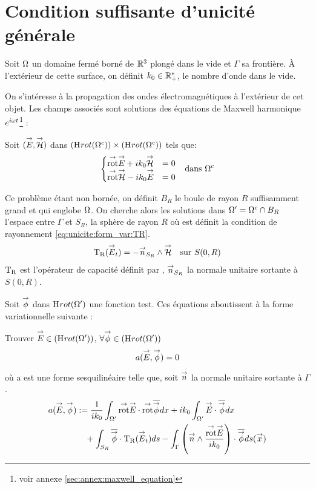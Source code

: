 \section{Condition suffisante d'unicité générale}

  Soit \(\Omega\) un domaine fermé borné de \(\mathbb R^3\) plongé dans le vide et \(\Gamma\) sa frontière.
  À l'extérieur de cette surface, on définit \(k_0 \in \mathbb R_+^*\), le nombre d'onde dans le vide.

  On s’intéresse à la propagation des ondes électromagnétiques à l'extérieur de cet objet. Les champs associés sont solutions des équations de Maxwell harmonique \(e^{i\omega t}\)\footnote{voir annexe \ref{sec:annex:maxwell_equation}} :

  Soit \(({\overset{\rightarrow}{E}},{\overset{\rightarrow}{\mathcal{H}}})\) dans \((\mathrm{H}_\mathrm{{}}{rot}(\Omega^c)) \times (\mathrm{H}_\mathrm{{}}{rot}(\Omega^c))\) tels que:
  \begin{align}
  \left\lbrace
    \begin{matrix}
      {{\overset{\rightarrow}{\operatorname{rot}}}} {\overset{\rightarrow}{E}} + i k_0 {\overset{\rightarrow}{\mathcal{H}}} &= 0
      \\
      {{\overset{\rightarrow}{\operatorname{rot}}}} {\overset{\rightarrow}{\mathcal{H}}} - i k_0 {\overset{\rightarrow}{E}} &= 0
    \end{matrix}
    \right. && \text{dans \(\Omega^c\)}
  \end{align}

  Ce problème étant non bornée, on définit \(B_R\) le boule de rayon \(R\) suffisamment grand et qui englobe \(\Omega\). On cherche alors les solutions dans \(\Omega'=\Omega^c\cap B_R\) l'espace entre \(\Gamma\) et \(S_R\), la sphère de rayon \(R\) où est définit la condition de rayonnement \eqref{eq:unicite:form_var:TR}.
  \begin{equation}
    \label{eq:unicite:form_var:TR}
    \begin{aligned}
    \operatorname{T_R}({\overset{\rightarrow}{E}}_t) = - {\overset{\rightarrow}{n}}_{S_R} \wedge {\overset{\rightarrow}{\mathcal{H}}} && \text{sur \(S(0,R)\)}
    \end{aligned}
  \end{equation}
  \(\operatorname{T_R}\) est l'opérateur de capacité définit par \cite[p.~200]{nedelec_acoustic_2001}, \({\overset{\rightarrow}{n}}_{S_R}\) la normale unitaire sortante à \(S(0,R)\).

  Soit \({\overset{\rightarrow}{\phi}}\) dans \(\mathrm{H}_\mathrm{{}}{rot}(\Omega')\) une fonction test. Ces équations aboutissent à la forme variationnelle suivante :
  \begin{prop}
    Trouver \({\overset{\rightarrow}{E}} \in \left(\mathrm{H}_\mathrm{{}}{rot}(\Omega')\right)\), \(\forall {\overset{\rightarrow}{\phi}} \in \left(\mathrm{H}_\mathrm{{}}{rot}(\Omega')\right)\)
    \[
      a({\overset{\rightarrow}{E}},{\overset{\rightarrow}{\phi}}) = 0
    \]
  \end{prop}

  où a est une forme sesquilinéaire telle que, soit \({\overset{\rightarrow}{n}}\) la normale unitaire sortante à \(\Gamma\).
  \begin{equation*}
    \begin{aligned}
    a({\overset{\rightarrow}{E}},{\overset{\rightarrow}{\phi}}) &:=  \dfrac{1}{ik_0} \int_{\Omega'} {{\overset{\rightarrow}{\operatorname{rot}}}} {\overset{\rightarrow}{E}} \cdot {{\overset{\rightarrow}{\operatorname{rot}}}} {\overline{{\overset{\rightarrow}{\phi}}}} dx + ik_0\int_{\Omega'}{\overset{\rightarrow}{E}}\cdot{\overline{{\overset{\rightarrow}{\phi}}}} dx
      \\ 
      & \quad + \int_{S_R} {\overline{ {\overset{\rightarrow}{\phi}} }} \cdot \operatorname{T_R}({\overset{\rightarrow}{E}}_t)ds - \int_\Gamma \left({\overset{\rightarrow}{n}} \wedge \dfrac{{{\overset{\rightarrow}{\operatorname{rot}}}} {\overset{\rightarrow}{E}}}{ik_0}\right) \cdot {\overline{{\overset{\rightarrow}{\phi}}}} ds({\overset{\rightarrow}{x}})
    \end{aligned}
   \end{equation*}

